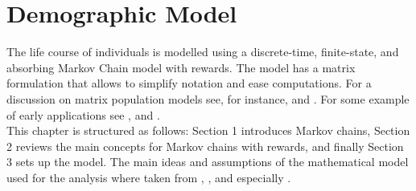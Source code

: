 \documentclass[\main/main.tex]{subfiles}
\begin{document}
\chapter{Demographic Model}

The life course of individuals is modelled using a discrete-time, finite-state, and absorbing Markov Chain model with rewards.
The model has a matrix formulation that allows to simplify notation and ease computations. For a discussion on matrix population models see, for instance, \cite{Caswell2001} and \cite{Keyfitz2005}. For some example of early applications see \citet{Leslie1945, Leslie1948}, \cite{Keyfitz1964} and \cite{Rogers1966}.\\

This chapter is structured as follows: Section 1 introduces Markov chains, Section 2 reviews the main concepts for Markov chains with rewards, and finally Section 3 sets up the model.
The main ideas and assumptions of the mathematical model used for the analysis where taken from \cite{Caswell2006}, \cite{VanDaalen2017}, and especially \cite{Caswell2018}.







\end{document}
